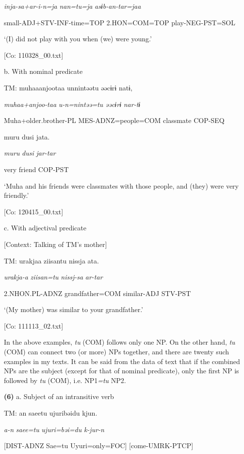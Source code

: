       \textit{inja-sa+ar-i-n=ja}  \textit{nan=tu=ja}  \textit{asɨb-an-tar=jaa}

      small-ADJ+STV-INF-time=TOP  2.HON=COM=TOP  play-NEG-PST=SOL

      ‘(I) did not play with you when (we) were young.’

      [Co: 110328\_00.txt]

  b.  With nominal predicate

    TM:  muhaaanjootaa  unnintəətu  əəcɨrɨ  natɨ,

      \textit{muhaa+anjoo-taa}  \textit{u-n=nintəə=tu}  \textit{əəcɨrɨ}  \textit{nar-tɨ}

      Muha+older.brother-PL  MES-ADNZ=people=COM  classmate  COP-SEQ

      muru  dusi  jata.

      \textit{muru}  \textit{dusi}  \textit{jar-tar}

      very  friend  COP-PST

      ‘Muha and his friends were classmates with those people, and (they) were very friendly.’

      [Co: 120415\_00.txt]

  c.  With adjectival predicate

    [Context: Talking of TM’s mother]

    TM:  urakjaa  ziisantu  nissja  ata.

      \textit{urakja-a}  \textit{ziisan=tu}  \textit{nissj-sa}  \textit{ar-tar}

      2.NHON.PL-ADNZ  grandfather=COM  similar-ADJ  STV-PST

      ‘(My mother) was similar to your grandfather.’

      [Co: 111113\_02.txt]

In the above examples, \textit{tu} (COM) follows only one NP. On the other hand, \textit{tu} (COM) can connect two (or more) NPs together, and there are twenty such examples in my texts. It can be said from the data of text that if the combined NPs are the subject (except for that of nominal predicate), only the first NP is followed by \textit{tu} (COM), i.e. NP1\textit{=tu} NP2.

\textbf{(6)}  a.  Subject of an intransitive verb

    TM:  an  saeetu  ujuribəidu  kjun.

      \textit{a-n}  \textit{saee=tu}  \textit{ujuri=bəi=du}  \textit{k-jur-n}

      [DIST-ADNZ  Sae=tu  Uyuri=only=FOC]  [come-UMRK-PTCP]

